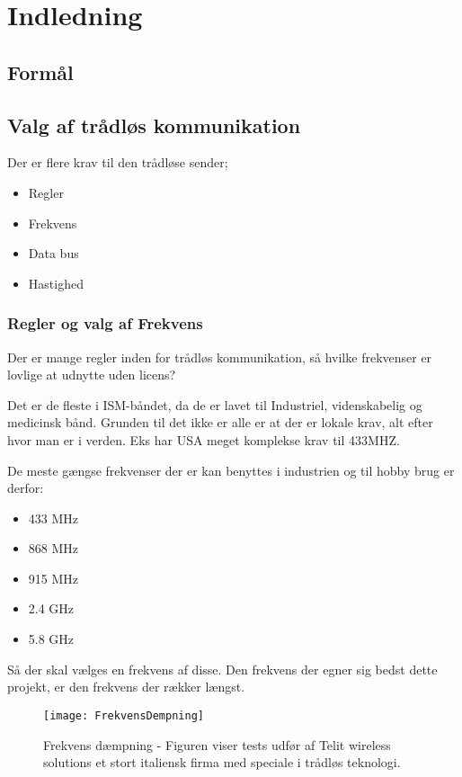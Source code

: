 \documentclass[Main]{subfiles}
\begin{document}
\chapter{Indledning}

\section{Formål}

\section{Valg af trådløs kommunikation}

Der er flere krav til den trådløse sender;

\begin{itemize}
\item Regler
\item Frekvens
\item Data bus
\item Hastighed
\end{itemize}

\subsection{Regler og valg af Frekvens}
Der er mange regler inden for trådløs kommunikation, så hvilke frekvenser er lovlige at udnytte uden licens?

Det er de fleste i ISM-båndet, da de er lavet til  Industriel, videnskabelig og medicinsk bånd. Grunden til det ikke er alle er at der er lokale krav, alt efter hvor man er i verden. Eks har USA meget komplekse krav til 433MHZ.\cite[s. 32]{Lov1}

De meste gængse frekvenser der er kan benyttes i industrien og til hobby brug er derfor:

\begin{itemize}
\item 433 MHz
\item 868 MHz
\item 915 MHz
\item 2.4 GHz
\item 5.8 GHz
\end{itemize}

Så der skal vælges en frekvens af disse.
Den frekvens der egner sig bedst dette projekt, er den frekvens der rækker længst. 

\begin{figure}[H]
\centering
\texttt{[image: FrekvensDempning]}
\caption{Frekvens dæmpning - Figuren viser tests udfør af Telit wireless solutions et stort italiensk firma med speciale i trådløs teknologi.}
\end{figure}
\end{document}
